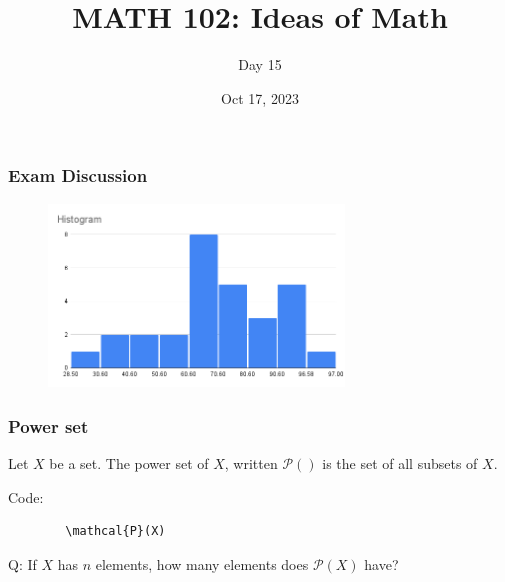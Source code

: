 \documentclass[aspectratio=169]{beamer}
\title{MATH 102: Ideas of Math}
\author{Day 15}
\date{Oct 17, 2023}
\begin{document}
\frame{\titlepage}

\begin{frame}
    \frametitle{ Exam Discussion }
    \begin{figure}
        \begin{center}
            \includegraphics[width=0.7\textwidth]{Histogram-ideas.png}
        \end{center}
    \end{figure}
\end{frame}

\begin{frame}[fragile]
    \frametitle{ Power set }
    \begin{definition}
        Let $X$ be a set. The power set of $X$, written $\mathcal{P}()$ is the set of all subsets of $X$.

        Code:
        \begin{verbatim}
        \mathcal{P}(X)
        \end{verbatim}

    \end{definition}
\end{frame}

\begin{frame}
    Q: If $X$ has $n$ elements, how many elements does $\mathcal{P}(X)$ have?
\end{frame}
\end{document}
